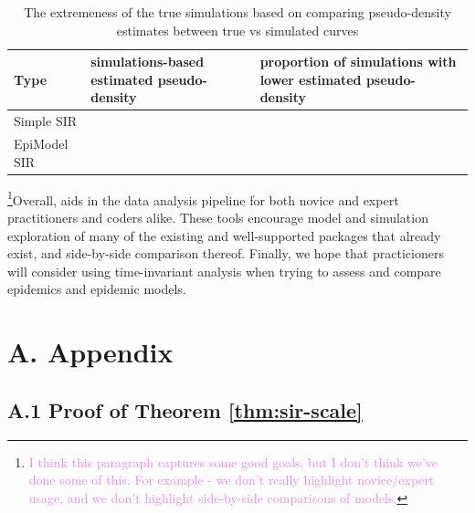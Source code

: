 \documentclass[
  shortnames]{jss}
\begin{document}
\begin{CodeChunk}
\begin{table}[!h]

\caption{\label{tab:hags-extreme}The extremeness of the true simulations based on comparing pseudo-density estimates between true vs simulated curves}
\centering
\begin{tabular}[t]{l>{\raggedleft\arraybackslash}p{6cm}>{\raggedleft\arraybackslash}p{6cm}}
\toprule
Type & simulations-based estimated pseudo-density & proportion of simulations with lower estimated pseudo-density\\
\midrule
Simple SIR & 0.0036733 & 0.00\\
EpiModel SIR & 0.0149686 & 0.02\\
\bottomrule
\end{tabular}
\end{table}

\end{CodeChunk}

\footnote{\textcolor{violet}{I think this paragraph captures some good goals, but I don't think we've done some of this. For example - we don't really highlight novice/expert usage, and we don't highlight side-by-side comparisons of models.}}Overall,
 aids in the data analysis pipeline for both novice and
expert practitioners and coders alike. These tools encourage model and
simulation exploration of many of the existing and well-supported
packages that already exist, and side-by-side comparison thereof.
Finally, we hope that practicioners will consider using time-invariant
analysis when trying to assess and compare epidemics and epidemic
models.

\hypertarget{a.-appendix}{%
\section*{A. Appendix}\label{a.-appendix}}

\hypertarget{a.1-proof-of-theorem}{%
\subsection*{\texorpdfstring{A.1 Proof of Theorem
\ref{thm:sir-scale}}{A.1 Proof of Theorem }}\label{a.1-proof-of-theorem}}
\end{document}
